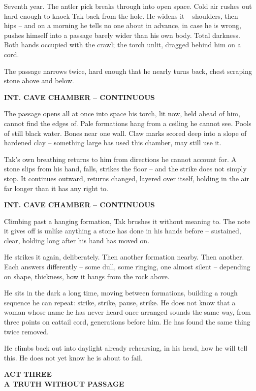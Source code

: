 \documentclass[12pt]{article}
\newcommand{\sceneheading}[1]{%
  \bigskip\noindent\textbf{#1}\par\smallskip
}
\newcommand{\action}[1]{%
  \noindent #1\par\medskip
}
\newcommand{\actbreak}[1]{%
  \clearpage\thispagestyle{empty}\vspace*{3in}
  \begin{center}{\Large\textbf{#1}}\end{center}
  \clearpage
}
\begin{document}
\action{Seventh year. The antler pick breaks through into open space. Cold air rushes out hard enough to knock Tak back from the hole. He widens it -- shoulders, then hips -- and on a morning he tells no one about in advance, in case he is wrong, pushes himself into a passage barely wider than his own body. Total darkness. Both hands occupied with the crawl; the torch unlit, dragged behind him on a cord.}

\action{The passage narrows twice, hard enough that he nearly turns back, chest scraping stone above and below.}

\sceneheading{INT. CAVE CHAMBER -- CONTINUOUS}

\action{The passage opens all at once into space his torch, lit now, held ahead of him, cannot find the edges of. Pale formations hang from a ceiling he cannot see. Pools of still black water. Bones near one wall. Claw marks scored deep into a slope of hardened clay -- something large has used this chamber, may still use it.}

\action{Tak's own breathing returns to him from directions he cannot account for. A stone slips from his hand, falls, strikes the floor -- and the strike does not simply stop. It continues outward, returns changed, layered over itself, holding in the air far longer than it has any right to.}

\sceneheading{INT. CAVE CHAMBER -- CONTINUOUS}

\action{Climbing past a hanging formation, Tak brushes it without meaning to. The note it gives off is unlike anything a stone has done in his hands before -- sustained, clear, holding long after his hand has moved on.}

\action{He strikes it again, deliberately. Then another formation nearby. Then another. Each answers differently -- some dull, some ringing, one almost silent -- depending on shape, thickness, how it hangs from the rock above.}

\action{He sits in the dark a long time, moving between formations, building a rough sequence he can repeat: strike, strike, pause, strike. He does not know that a woman whose name he has never heard once arranged sounds the same way, from three points on cattail cord, generations before him. He has found the same thing twice removed.}

\action{He climbs back out into daylight already rehearsing, in his head, how he will tell this. He does not yet know he is about to fail.}

\actbreak{ACT THREE\\ \large A TRUTH WITHOUT PASSAGE}
\end{document}
